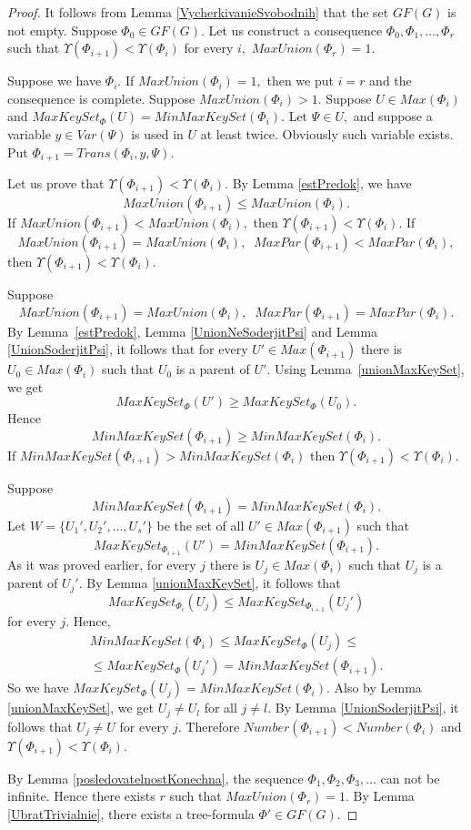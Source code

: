 \documentclass{au}
\theoremstyle{plain}
\theoremstyle{definition}
\theoremstyle{remark}
\numberwithin{equation}{section}
\begin{document}
\begin{proof}

It follows from Lemma \ref{VycherkivanieSvobodnih} that
the set $GF(G)$ is not empty.
Suppose $\Phi_{0}\in GF(G).$
Let us construct a consequence
$\Phi_{0},\Phi_{1},\ldots,\Phi_{r}$
such that
$\Upsilon(\Phi_{i+1})< \Upsilon(\Phi_{i})$ for every $i,$
$MaxUnion(\Phi_{r}) = 1.$

Suppose we have $\Phi_{i}.$
If $MaxUnion(\Phi_{i})=1,$  then we put $i=r$ and the consequence is complete.
Suppose $MaxUnion(\Phi_{i})>1.$
Suppose $U\in Max(\Phi_{i})$
and
$MaxKeySet_{\Phi}(U) = MinMaxKeySet(\Phi_{i}).$
Let $\Psi\in U,$ and suppose
a variable $y\in Var(\Psi)$ is used in $U$ at least twice.
Obviously such variable exists.
Put $\Phi_{i+1} =
Trans(\Phi_{i}, y, \Psi).$

Let us prove that $\Upsilon(\Phi_{i+1})<\Upsilon(\Phi_{i}).$
By Lemma \ref{estPredok},
we have
$$MaxUnion(\Phi_{i+1}) \le MaxUnion(\Phi_{i}).$$
If $MaxUnion(\Phi_{i+1}) < MaxUnion(\Phi_{i}),$ then
$\Upsilon(\Phi_{i+1})<\Upsilon(\Phi_{i}).$
If
$$MaxUnion(\Phi_{i+1}) = MaxUnion(\Phi_{i}),\;\;
MaxPar(\Phi_{i+1}) < MaxPar(\Phi_{i}),$$
then $\Upsilon(\Phi_{i+1})<\Upsilon(\Phi_{i}).$

Suppose
$$MaxUnion(\Phi_{i+1}) = MaxUnion(\Phi_{i}),\;\;
MaxPar(\Phi_{i+1}) = MaxPar(\Phi_{i}).$$
By Lemma~\ref{estPredok}, Lemma \ref{UnionNeSoderjitPsi}
and Lemma \ref{UnionSoderjitPsi},
it follows that
for every $U'\in Max(\Phi_{i+1})$ there is $U_{0}\in Max(\Phi_{i})$
such that $U_{0}$ is a parent of $U'.$
Using Lemma~\ref{unionMaxKeySet},
we get $$MaxKeySet_{\Phi}(U')\ge MaxKeySet_{\Phi}(U_{0}).$$
Hence $$MinMaxKeySet(\Phi_{i+1})\ge MinMaxKeySet(\Phi_{i}).$$
If $MinMaxKeySet(\Phi_{i+1})>MinMaxKeySet(\Phi_{i})$
then $\Upsilon(\Phi_{i+1})<\Upsilon(\Phi_{i}).$

Suppose $$MinMaxKeySet(\Phi_{i+1})=MinMaxKeySet(\Phi_{i}).$$
Let $W= \{U_{1}',U_{2}',\ldots,U_{s}'\}$ be the set of all $U'\in Max(\Phi_{i+1})$
such that $$MaxKeySet_{\Phi_{i+1}}(U') =MinMaxKeySet(\Phi_{i+1}).$$
As it was proved earlier,
for every $j$
there is $U_{j}\in Max(\Phi_{i})$
such that $U_{j}$ is a parent of $U_{j}'.$
By Lemma \ref{unionMaxKeySet},
it follows that
$$MaxKeySet_{\Phi_{i}}(U_{j}) \le MaxKeySet_{\Phi_{i+1}}(U_{j}')$$
for every $j.$
Hence, 
\begin{multline*}MinMaxKeySet(\Phi_{i})\le MaxKeySet_{\Phi}(U_{j}) \le \\ \le
MaxKeySet_{\Phi}(U_{j}') = MinMaxKeySet(\Phi_{i+1}).\end{multline*}
So we have $MaxKeySet_{\Phi}(U_{j}) = MinMaxKeySet(\Phi_{i}).$
Also by Lemma \ref{unionMaxKeySet},
we get $U_{j}\neq U_{l}$ for all $j\neq l.$
By Lemma \ref{UnionSoderjitPsi}, it follows that
$U_{j}\neq U$ for every $j.$
Therefore $Number(\Phi_{i+1})<Number(\Phi_{i})$
and $\Upsilon(\Phi_{i+1})<\Upsilon(\Phi_{i}).$

By Lemma \ref{posledovatelnostKonechna},
the sequence $\Phi_{1},\Phi_{2},\Phi_{3},\ldots$ can not be infinite.
Hence there exists $r$ such that $MaxUnion(\Phi_{r})=1$.
By Lemma \ref{UbratTrivialnie}, there exists a tree-formula $\Phi'\in GF(G).$

\end{proof} 
\end{document}
